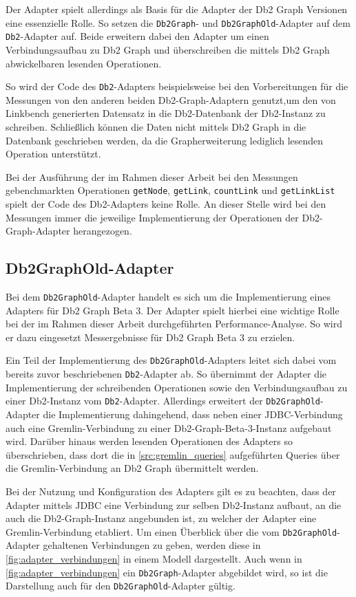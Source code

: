 Der Adapter spielt allerdings als Basis für die Adapter der Db2 Graph Versionen eine essenzielle Rolle. So setzen die \texttt{Db2Graph}- und \texttt{Db2GraphOld}-Adapter auf dem \texttt{Db2}-Adapter auf. Beide erweitern dabei den Adapter um einen Verbindungsaufbau zu Db2 Graph und überschreiben die mittels Db2 Graph abwickelbaren lesenden Operationen.

So wird der Code des \texttt{Db2}-Adapters beispielsweise bei den Vorbereitungen für die Messungen von den anderen beiden Db2-Graph-Adaptern genutzt,um den von Linkbench generierten Datensatz in die Db2-Datenbank der Db2-Instanz zu schreiben. Schließlich können die Daten nicht mittels Db2 Graph in die Datenbank geschrieben werden, da die Grapherweiterung lediglich lesenden Operation unterstützt.

Bei der Ausführung der im Rahmen dieser Arbeit bei den Messungen gebenchmarkten Operationen \texttt{getNode}, \texttt{getLink}, \texttt{countLink} und \texttt{getLinkList} spielt der Code des Db2-Adapters keine Rolle. An dieser Stelle wird bei den Messungen immer die jeweilige Implementierung der Operationen der Db2-Graph-Adapter herangezogen.

\subsection{Db2GraphOld-Adapter}
\label{implementierung:adapter:db2graph:old}
Bei dem \texttt{Db2GraphOld}-Adapter handelt es sich um die Implementierung eines Adapters für Db2 Graph Beta 3. Der Adapter spielt hierbei eine wichtige Rolle bei der im Rahmen dieser Arbeit durchgeführten Performance-Analyse. So wird er dazu eingesetzt Messergebnisse für Db2 Graph Beta 3 zu erzielen. 

Ein Teil der Implementierung des \texttt{Db2GraphOld}-Adapters leitet sich dabei vom bereits zuvor beschriebenen \texttt{Db2}-Adapter ab. So übernimmt der Adapter die Implementierung der schreibenden Operationen sowie den Verbindungsaufbau zu einer Db2-Instanz vom \texttt{Db2}-Adapter. Allerdings erweitert der \texttt{Db2GraphOld}-Adapter die Implementierung dahingehend, dass neben einer JDBC-Verbindung auch eine Gremlin-Verbindung zu einer Db2-Graph-Beta-3-Instanz aufgebaut wird. Darüber hinaus werden lesenden Operationen des Adapters so überschrieben, dass dort die in \autoref{src:gremlin_queries} aufgeführten Queries über die Gremlin-Verbindung an Db2 Graph übermittelt werden. 

Bei der Nutzung und Konfiguration des Adapters gilt es zu beachten, dass der Adapter mittels JDBC eine Verbindung zur selben Db2-Instanz aufbaut, an die auch die Db2-Graph-Instanz angebunden ist, zu welcher der Adapter eine Gremlin-Verbindung etabliert. Um einen Überblick über die vom \texttt{Db2GraphOld}-Adapter gehaltenen Verbindungen zu geben, werden diese in \autoref{fig:adapter_verbindungen} in einem Modell dargestellt. Auch wenn in \autoref{fig:adapter_verbindungen} ein \texttt{Db2Graph}-Adapter abgebildet wird, so ist die Darstellung auch für den \texttt{Db2GraphOld}-Adapter gültig.

